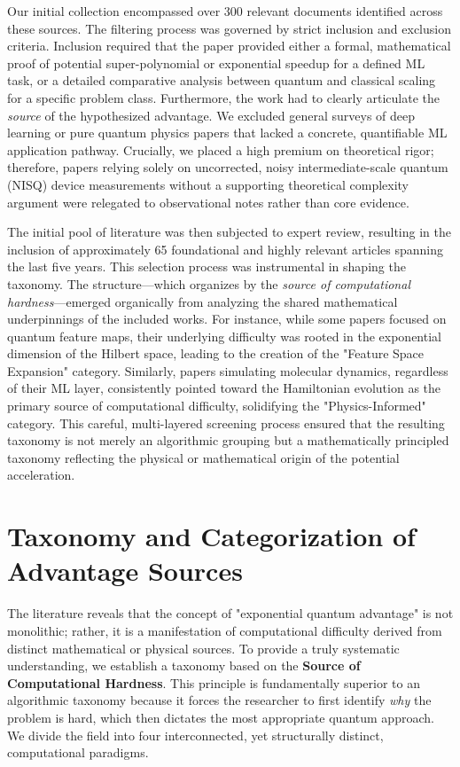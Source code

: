 \documentclass{article}
\begin{document}
Our initial collection encompassed over 300 relevant documents identified across these sources. The filtering process was governed by strict inclusion and exclusion criteria. Inclusion required that the paper provided either a formal, mathematical proof of potential super-polynomial or exponential speedup for a defined ML task, or a detailed comparative analysis between quantum and classical scaling for a specific problem class. Furthermore, the work had to clearly articulate the \textit{source} of the hypothesized advantage. We excluded general surveys of deep learning or pure quantum physics papers that lacked a concrete, quantifiable ML application pathway. Crucially, we placed a high premium on theoretical rigor; therefore, papers relying solely on uncorrected, noisy intermediate-scale quantum (NISQ) device measurements without a supporting theoretical complexity argument were relegated to observational notes rather than core evidence.

The initial pool of literature was then subjected to expert review, resulting in the inclusion of approximately 65 foundational and highly relevant articles spanning the last five years. This selection process was instrumental in shaping the taxonomy. The structure---which organizes by the \textit{source of computational hardness}---emerged organically from analyzing the shared mathematical underpinnings of the included works. For instance, while some papers focused on quantum feature maps, their underlying difficulty was rooted in the exponential dimension of the Hilbert space, leading to the creation of the "Feature Space Expansion" category. Similarly, papers simulating molecular dynamics, regardless of their ML layer, consistently pointed toward the Hamiltonian evolution as the primary source of computational difficulty, solidifying the "Physics-Informed" category. This careful, multi-layered screening process ensured that the resulting taxonomy is not merely an algorithmic grouping but a mathematically principled taxonomy reflecting the physical or mathematical origin of the potential acceleration.

\section{Taxonomy and Categorization of Advantage Sources}

\label{sec:taxonomy\_and\_categorization\_of\_advantage}

The literature reveals that the concept of "exponential quantum advantage" is not monolithic; rather, it is a manifestation of computational difficulty derived from distinct mathematical or physical sources. To provide a truly systematic understanding, we establish a taxonomy based on the \textbf{Source of Computational Hardness}. This principle is fundamentally superior to an algorithmic taxonomy because it forces the researcher to first identify \textit{why} the problem is hard, which then dictates the most appropriate quantum approach. We divide the field into four interconnected, yet structurally distinct, computational paradigms.
\end{document}
